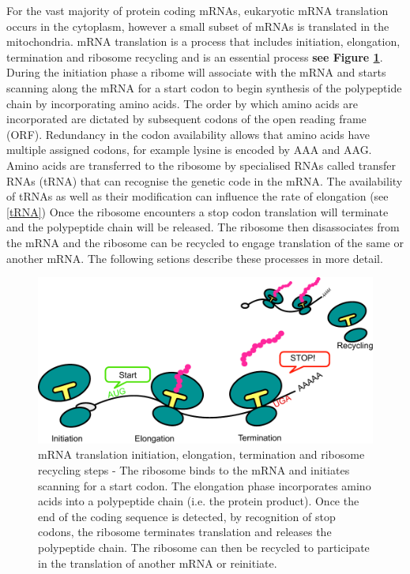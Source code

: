 \documentclass[12pt,openany]{book}
\begin{document}
\clearpage
 For the vast majority of protein coding mRNAs, eukaryotic mRNA
translation occurs in the cytoplasm, however a small subset of mRNAs is
translated in the mitochondria. mRNA translation is a process that
includes initiation, elongation, termination and ribosome recycling and
is an essential process \textbf{see Figure \ref{fig:doodlemRNASteps}}.
During the initiation phase a ribome will associate with the mRNA and
starts scanning along the mRNA for a start codon to begin synthesis of
the polypeptide chain by incorporating amino acids. The order by which
amino acids are incorporated are dictated by subsequent codons of the
open reading frame (ORF). Redundancy in the codon availability allows
that amino acids have multiple assigned codons, for example lysine is
encoded by AAA and AAG. Amino acids are transferred to the ribosome by
specialised RNAs called transfer RNAs (tRNA) that can recognise the
genetic code in the mRNA. The availability of tRNAs as well as their
modification can influence the rate of elongation (see \ref{tRNA}) Once
the ribosome encounters a stop codon translation will terminate and the
polypeptide chain will be released. The ribosome then disassociates from
the mRNA and the ribosome can be recycled to engage translation of the
same or another mRNA. The following setions describe these processes in
more detail.

\begin{figure}
  \includegraphics{./figures/doodleTranslation.pdf}
  \caption{mRNA translation initiation, elongation, termination and ribosome recycling steps - The ribosome binds to the mRNA and initiates scanning for a start codon. The elongation phase incorporates amino acids into a polypeptide chain (i.e. the protein product). Once the end of the coding sequence is detected, by recognition of stop codons, the ribosome terminates translation and releases the polypeptide chain. The ribosome can then be recycled to participate in the translation of another mRNA or reinitiate. \label{fig:doodlemRNASteps}}
\end{figure}
\end{document}
